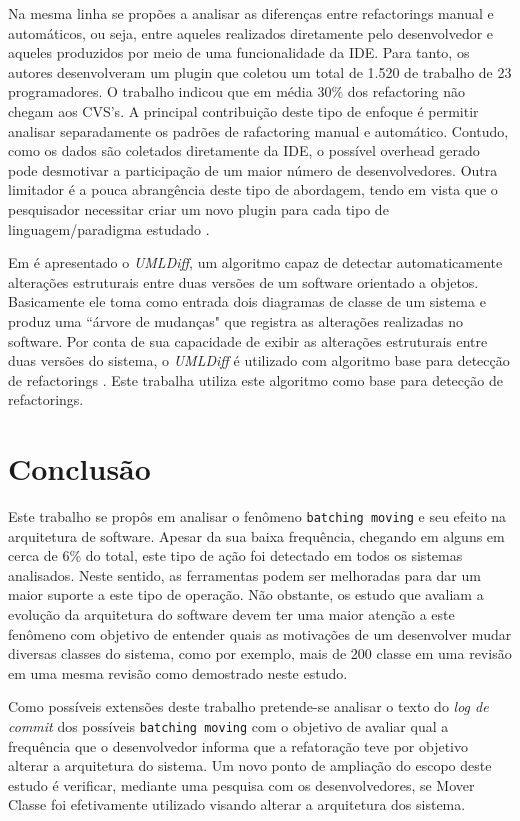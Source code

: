 \documentclass[12pt]{article}
\begin{document}
Na mesma linha \cite{NegaraETAL2013ManualRefactorings} se propões a analisar as diferenças entre refactorings manual e automáticos, ou seja, entre aqueles realizados diretamente pelo desenvolvedor e aqueles produzidos por meio de uma funcionalidade da IDE. Para tanto, os autores desenvolveram um plugin que coletou um total de 1.520 de trabalho de 23 programadores. O trabalho indicou que em média 30\% dos refactoring não chegam aos CVS's. A principal contribuição deste tipo de enfoque é permitir analisar separadamente os padrões de rafactoring manual e automático. Contudo, como os dados são coletados diretamente da IDE, o possível overhead gerado pode desmotivar a participação de um maior número de desenvolvedores.  Outra limitador é a pouca abrangência deste tipo de abordagem, tendo em vista que o pesquisador necessitar criar um novo plugin para cada tipo de linguagem/paradigma estudado \cite{Robbes:2007:MCS:1268983.1269029}.

Em \cite{Xing:2005:UAO:1101908.1101919} é apresentado o \textit{UMLDiff},  um algoritmo capaz de detectar automaticamente alterações estruturais entre duas versões de um software orientado a objetos. Basicamente ele toma como entrada dois diagramas de classe de um sistema e produz uma ``árvore de mudanças" que registra as alterações realizadas no software. Por conta de sua capacidade de exibir as alterações estruturais entre duas versões do sistema, o \textit{UMLDiff} é utilizado com algoritmo base para detecção de refactorings \cite{Tsantalis:2013:MES:2555523.2555539}{}. Este trabalha utiliza este algoritmo como base para detecção de refactorings.

\section{Conclusão}
\label{sec:conclusao}

Este trabalho se propôs em analisar o fenômeno \texttt{batching moving} e seu efeito na arquitetura de software. Apesar da sua baixa frequência, chegando em alguns em cerca de 6\% do total, este tipo de ação foi detectado em todos os sistemas analisados. Neste sentido, as ferramentas podem ser melhoradas para dar um maior suporte a este tipo de operação. Não obstante, os estudo que avaliam a evolução da arquitetura do software devem ter uma maior atenção a este fenômeno com objetivo de entender quais as motivações de um desenvolver mudar diversas classes do sistema, como por exemplo, mais de 200 classe em uma revisão em uma mesma revisão como demostrado neste estudo.

Como possíveis extensões deste trabalho pretende-se analisar o texto do \textit{log de commit} dos possíveis \texttt{batching moving} com o objetivo de avaliar qual a frequência que o desenvolvedor informa que a refatoração teve por objetivo alterar a arquitetura do sistema. Um novo ponto de ampliação do escopo deste estudo é verificar, mediante uma pesquisa com os desenvolvedores, se Mover Classe foi efetivamente utilizado visando alterar a arquitetura dos sistema.



\end{document}
